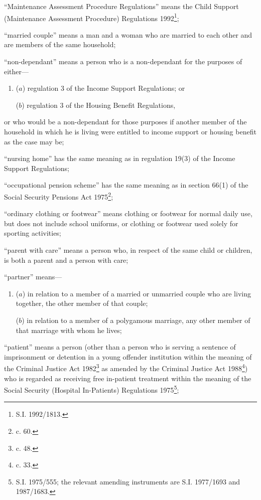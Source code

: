 \documentclass[a4paper]{article}
\begin{document}
\begin{enumerate}
“Maintenance Assessment Procedure Regulations” means the Child Support (Maintenance Assessment Procedure) Regulations 1992\footnote{\frenchspacing S.I. 1992/1813.};

“married couple” means a man and a woman who are married to each other and are members of the same household;

“non-dependant” means a person who is a non-dependant for the purposes of either—
\begin{enumerate}\item[]
($a$)
regulation 3 of the Income Support Regulations; or

($b$)
regulation 3 of the Housing Benefit Regulations,
\end{enumerate}
or who would be a non-dependant for those purposes if another member of the household in which he is living were entitled to income support or housing benefit as the case may be;

“nursing home” has the same meaning as in regulation 19(3) of the Income Support Regulations;

“occupational pension scheme” has the same meaning as in section 66(1) of the Social Security Pensions Act 1975\footnote{ c. 60.};

“ordinary clothing or footwear” means clothing or footwear for normal daily use, but does not include school uniforms, or clothing or footwear used solely for sporting activities;

“parent with care” means a person who, in respect of the same child or children, is both a parent and a person with care;

“partner” means—
\begin{enumerate}\item[]
($a$)
in relation to a member of a married or unmarried couple who are living together, the other member of that couple;

($b$)
in relation to a member of a polygamous marriage, any other member of that marriage with whom he lives;
\end{enumerate}

“patient” means a person (other than a person who is serving a sentence of imprisonment or detention in a young offender institution within the meaning of the Criminal Justice Act 1982\footnote{ c. 48.} as amended by the Criminal Justice Act 1988\footnote{ c. 33.}) who is regarded as receiving free in-patient treatment within the meaning of the Social Security (Hospital In-Patients) Regulations 1975\footnote{\frenchspacing S.I. 1975/555; the relevant amending instruments are S.I. 1977/1693 and 1987/1683.};


\end{enumerate}
\end{document}
